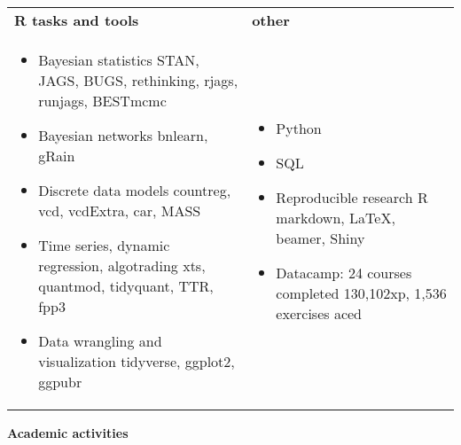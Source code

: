 \documentclass[10pt, a4paper]{article}
\begin{document}
\begin{tabular}{p{8cm}p{6cm}}
	\textbf{\textsf{R} tasks and tools} & \textbf{other} \\

\vspace{-6mm}
\begin{itemize}[leftmargin=*]   \setlength{\itemsep}{0pt} \scriptsize
	\item \normalsize Bayesian statistics	 \newline  \scriptsize \textsf{STAN, JAGS, BUGS, rethinking, rjags, runjags, BESTmcmc}
	
	\item \normalsize  Bayesian networks  \newline  \scriptsize \textsf{bnlearn, gRain}

	\item \normalsize  Discrete data models  \newline  \scriptsize
	 \textsf{ countreg,  vcd, vcdExtra, car, MASS}

	\item \normalsize  Time series, dynamic regression, algotrading  \newline  \scriptsize
	\textsf{xts, quantmod, tidyquant, TTR, fpp3}
	
	\item \normalsize  Data wrangling and visualization  \newline  \scriptsize \textsf{tidyverse, ggplot2, ggpubr}

	
	

\end{itemize}
&
\vspace{-6mm}
\begin{itemize}[leftmargin=*]   \setlength{\itemsep}{0pt}\scriptsize
	\item \normalsize Python \scriptsize
	\item \normalsize SQL \scriptsize 
	\item \normalsize Reproducible research \newline \scriptsize 
	R markdown, LaTeX, beamer,  Shiny
	\item \normalsize \textsf{Datacamp}: 24 courses completed \newline \scriptsize   130,102xp, 1,536 exercises aced 
\end{itemize}
\end{tabular}	


\vspace{-3mm}	
\textbf{{\sc \Large Academic activities}}\\
\end{document}
